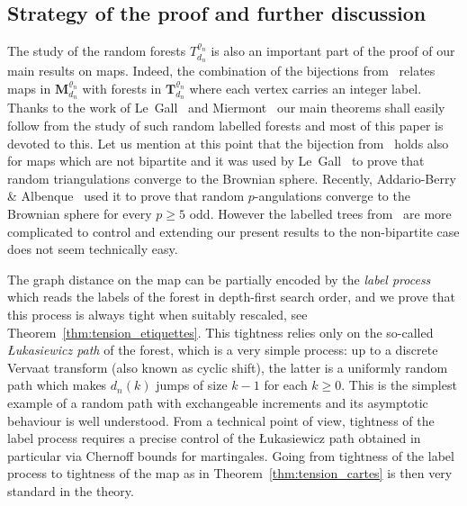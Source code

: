 \documentclass[10pt]{amsart}
\theoremstyle{definition}\newtheorem{defi}[theo]{Definition}\newtheorem{rema}[theo]{Remark}\newtheorem{exam}[theo]{Example}\newtheorem{exem}[theo]{Example}\newtheorem{nota}[theo]{Notation}
\newcommand{\1}{\ensembles{1}}
\newcommand{\Tree}{\mathbf{T}}
\newcommand{\Map}{\mathbf{M}}
\renewcommand{\ge}{\geqslant}
\newcommand{\Mn}{\Map_{d_n}^{\varrho_n}}
\newcommand{\fn}{T_{d_n}^{\varrho_n}}
\providecommand{\?}{}
\begin{document}
\subsection{Strategy of the proof and further discussion}

The study of the random forests $\fn$ is also an important part of the proof of our main results on maps. Indeed, the combination of the bijections from~\cite{BDG04, JS15} relates maps in $\Mn$ with forests in $\Tree_{d_n}^{\varrho_n}$ where each vertex carries an integer label. Thanks to the work of Le~Gall~\cite{LG13} and Miermont~\cite{Mie13} our main theorems shall easily follow from the study of such random labelled forests and most of this paper is devoted to this. Let us mention at this point that the bijection from~\cite{BDG04} holds also for maps which are not bipartite and it was used by Le~Gall~\cite{LG13} to prove that random triangulations converge to the Brownian sphere. Recently, Addario-Berry \& Albenque~\cite{ABA21} used it to prove that random $p$-angulations converge to the Brownian sphere for every $p \ge 5$ odd. However the labelled trees from~\cite{BDG04} are more complicated to control and extending our present results to the non-bipartite case does not seem technically easy.



The graph distance on the map can be partially encoded by the \emph{label process} which reads the labels of the forest in depth-first search order, and we prove that this process is always tight when suitably rescaled, see Theorem~\ref{thm:tension_etiquettes}. This tightness relies only on the so-called \emph{{\L}ukasiewicz path} of the forest, which is a very simple process: up to a discrete Vervaat transform (also known as cyclic shift), the latter is a uniformly random path which makes $d_n(k)$ jumps of size $k-1$ for each $k \ge 0$. This is the simplest example of a random path with exchangeable increments and its asymptotic behaviour is well understood. From a technical point of view, tightness of the label process requires a precise control of the {\L}ukasiewicz path obtained in particular via Chernoff bounds for martingales. Going from tightness of the label process to tightness of the map as in Theorem~\ref{thm:tension_cartes} is then very standard in the theory.
\end{document}
